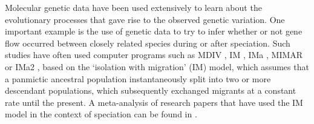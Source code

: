 \documentclass[11pt]{article}
\begin{document}
Molecular genetic data have been used extensively to learn about the evolutionary processes that gave rise to the observed genetic variation. 
One important example is the use of genetic data to try to infer whether or not gene flow occurred between closely related species during or after speciation. 
Such studies have often used computer programs such as MDIV \citep{Nielsen2001}, IM \citep{Hey2004, Hey2005}, IMa \citep{Hey2007}, MIMAR \citep{Becquet2007} or IMa2 \citep{Hey2010}, based on the `isolation with migration' (IM)
model, which assumes that a panmictic ancestral population instantaneously split into two or more descendant populations, which subsequently exchanged migrants at a constant rate until the present.
A meta-analysis of research papers that have used the IM model in the context of speciation can be found in \citet{Pinho2010}.
\end{document}
